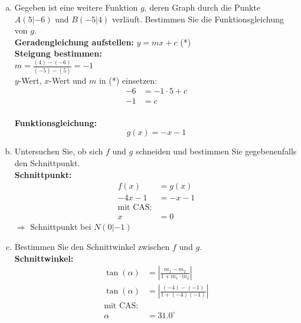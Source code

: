 \documentclass[12pt,fleqn]{article}
\theoremstyle{aufg}
\theoremstyle{bsp}
\begin{document}
\begin{flushleft}
\begin{enumerate}[a)]
\item 
Gegeben ist eine weitere Funktion $g$, deren Graph durch die Punkte $A(5|-6)$ und $B(-5|4)$ verl\"auft. Bestimmen Sie die Funktionsgleichung von $g$. \\ 
{\bf Geradengleichung aufstellen:} \quad $y=mx+c$ (*) \\ 
{\bf Steigung bestimmen:} \\ 
$m=\frac{(4)-(-6)}{(-5)-(5)}=-1$ \\ 
$y$-Wert, $x$-Wert und $m$ in (*) einsetzen: 
\begin{align*} 
-6&=-1\cdot5+ c \\ 
-1&= c 
\end{align*} \\ 
{\bf Funktionsgleichung:} 
\[g(x)=- x - 1\]
\item 
Untersuchen Sie, ob sich $f$ und $g$ schneiden und bestimmen Sie gegebenenfalls den Schnittpunkt. \\ 
{\bf Schnittpunkt:} 
\begin{align*} 
f(x)&=g(x) \\ 
- 4 x - 1&=- x - 1 \\ 
\text{mit CAS:} \\ 
x&=0\end{align*} 
$\Rightarrow$ Schnittpunkt bei $N(0|-1)$ \\ 

\item 
Bestimmen Sie den Schnittwinkel zwischen $f$ und $g$. \\ 
{\bf Schnittwinkel:} \\ 
\begin{align*} 
\tan(\alpha) &=\left|\frac{m_1-m_2}{1+m_1\cdot m_2}\right| \\ 
\tan(\alpha) &=\left|\frac{(-4)-(-1)}{1+(-4)(-1)}\right| \\ 
\text{mit CAS:} \\ 
\alpha &=31.0^{\circ} 
\end{align*} 

\end{enumerate} 
\end{flushleft} 
\end{document}

